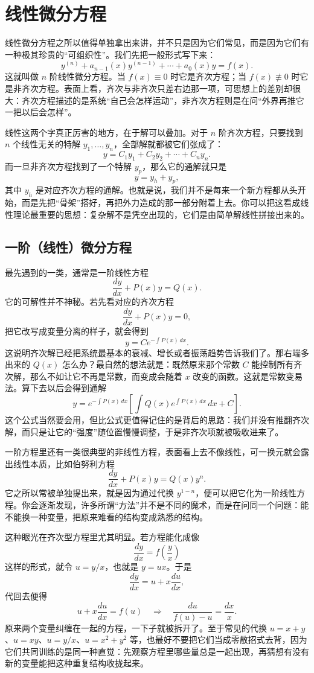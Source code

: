 \documentclass[UTF8]{ctexbook}
\begin{document}
\newpage
\section{线性微分方程}
线性微分方程之所以值得单独拿出来讲，并不只是因为它们常见，而是因为它们有一种极其珍贵的“可组织性”。我们先把一般形式写下来：
\[
y^{(n)}+a_{n-1}(x)y^{(n-1)}+\cdots+a_0(x)y=f(x).
\]
这就叫做 $n$ 阶线性微分方程。当 $f(x)\equiv 0$ 时它是齐次方程；当 $f(x)\not\equiv 0$ 时它是非齐次方程。表面上看，齐次与非齐次只差右边那一项，可思想上的差别却很大：齐次方程描述的是系统“自己会怎样运动”，非齐次方程则是在问“外界再推它一把以后会怎样”。

线性这两个字真正厉害的地方，在于解可以叠加。对于 $n$ 阶齐次方程，只要找到 $n$ 个线性无关的特解 $y_1,\dots,y_n$，全部解就都被它们张成了：
\[
y=C_1y_1+C_2y_2+\cdots+C_ny_n.
\]
而一旦非齐次方程找到了一个特解 $y_p$，那么它的通解就只是
\[
y=y_h+y_p,
\]
其中 $y_h$ 是对应齐次方程的通解。也就是说，我们并不是每来一个新方程都从头开始，而是先把“骨架”搭好，再把外力造成的那一部分附着上去。你可以把这看成线性理论最重要的思想：复杂解不是凭空出现的，它们是由简单解线性拼接出来的。

\subsection{一阶（线性）微分方程}
最先遇到的一类，通常是一阶线性方程
\[
\frac{dy}{dx}+P(x)y=Q(x).
\]
它的可解性并不神秘。若先看对应的齐次方程
\[
\frac{dy}{dx}+P(x)y=0,
\]
把它改写成变量分离的样子，就会得到
\[
y=Ce^{-\int P(x)\,dx}.
\]
这说明齐次解已经把系统最基本的衰减、增长或者振荡趋势告诉我们了。那右端多出来的 $Q(x)$ 怎么办？最自然的想法就是：既然原来那个常数 $C$ 能控制所有齐次解，那么不如让它不再是常数，而变成会随着 $x$ 改变的函数。这就是常数变易法。算下去以后会得到通解
\[
y=e^{-\int P(x)\,dx}\left[\int Q(x)e^{\int P(x)\,dx}\,dx+C\right].
\]
这个公式当然要会用，但比公式更值得记住的是背后的思路：我们并没有推翻齐次解，而只是让它的“强度”随位置慢慢调整，于是非齐次项就被吸收进来了。

一阶方程里还有一类很典型的非线性方程，表面看上去不像线性，可一换元就会露出线性本质，比如伯努利方程
\[
\frac{dy}{dx}+P(x)y=Q(x)y^n.
\]
它之所以常被单独提出来，就是因为通过代换 $y^{1-n}$，便可以把它化为一阶线性方程。你会逐渐发现，许多所谓“方法”并不是不同的魔术，而是在问同一个问题：能不能换一种变量，把原来难看的结构变成熟悉的结构。

这种眼光在齐次型方程里尤其明显。若方程能化成像
\[
\frac{dy}{dx}=f\!\left(\frac{y}{x}\right)
\]
这样的形式，就令 $u=y/x$，也就是 $y=ux$。于是
\[
\frac{dy}{dx}=u+x\frac{du}{dx},
\]
代回去便得
\[
u+x\frac{du}{dx}=f(u)
\quad\Rightarrow\quad
\frac{du}{f(u)-u}=\frac{dx}{x}.
\]
原来两个变量纠缠在一起的方程，一下子就被拆开了。至于常见的代换 $u=x+y$、$u=xy$、$u=y/x$、$u=x^2+y^2$ 等，也最好不要把它们当成零散招式去背，因为它们共同训练的是同一种直觉：先观察方程里哪些量总是一起出现，再猜想有没有新的变量能把这种重复结构收拢起来。
\end{document}
